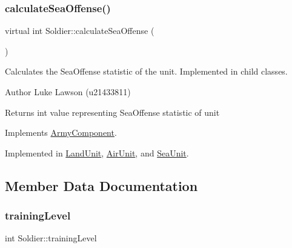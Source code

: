 \mbox{\label{class_soldier_acdaf5453ea0f87b3219185b0a52dd869}} 
\subsubsection{\texorpdfstring{calculateSeaOffense()}{calculateSeaOffense()}}
{\footnotesize\ttfamily virtual int Soldier\+::calculate\+Sea\+Offense (\begin{DoxyParamCaption}{ }\end{DoxyParamCaption})\hspace{0.3cm}{\ttfamily [pure virtual]}}



Calculates the Sea\+Offense statistic of the unit. Implemented in child classes. 

\begin{DoxyAuthor}{Author}
Luke Lawson (u21433811) 
\end{DoxyAuthor}
\begin{DoxyReturn}{Returns}
int value representing Sea\+Offense statistic of unit 
\end{DoxyReturn}


Implements \mbox{\hyperlink{class_army_component_a6e29f65ac92c18a82bf4a6a06d6d4457}{Army\+Component}}.



Implemented in \mbox{\hyperlink{class_land_unit_a40d93a3df8b92babc7a4f35a28dd3b73}{Land\+Unit}}, \mbox{\hyperlink{class_air_unit_a1e0b1b7905336477733191c6a66cf022}{Air\+Unit}}, and \mbox{\hyperlink{class_sea_unit_a3c275db4b9bf8cef62975d6c26ce79f8}{Sea\+Unit}}.



\subsection{Member Data Documentation}
\mbox{\label{class_soldier_ac140271761bd8022e68a70f5ca3984b8}} 
\subsubsection{\texorpdfstring{trainingLevel}{trainingLevel}}
{\footnotesize\ttfamily int Soldier\+::training\+Level\hspace{0.3cm}{\ttfamily [protected]}}

